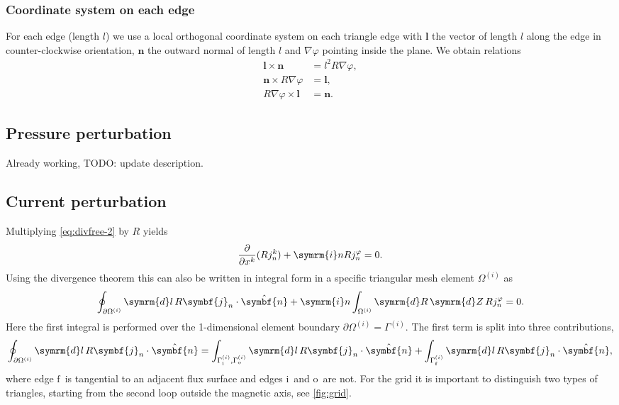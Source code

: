 \documentclass[a4paper, 10pt, english]{article}
\let\temp\vartheta
\let\vartheta\theta
\let\theta\temp
\let\temp\varphi
\let\varphi\phi
\let\phi\temp
\let\vec\symbf
\newcommand*\diff{\ensuremath{\symrm{d}}}  %
\newcommand*\im{\ensuremath{\symrm{i}}}  %
\newcommand*\pd[2][]{\ensuremath{\frac{\partial #1}{\partial #2}}}  %
\newcommand*\fs{\ensuremath{\textrm{f}}}  %
\newcommand*\inw{\ensuremath{\textrm{i}}}  %
\newcommand*\out{\ensuremath{\textrm{o}}}  %
\begin{document}
\subsubsection{Coordinate system on each edge}

For each edge (length $l$) we use a local orthogonal coordinate system on each triangle edge with $\vec{l}$ the vector of length $l$ along the edge in counter-clockwise orientation, $\vec{n}$ the outward normal of length $l$ and $\nabla \phi$ pointing inside the plane. We obtain relations
\begin{align}
  \vec{l} \times \vec{n} &= l^{2} R \nabla \phi, \\
  \vec{n} \times R \nabla \phi &= \vec{l}, \\
  R \nabla \phi \times \vec{l} &= \vec{n}.
\end{align}

\subsection{Pressure perturbation}

Already working, TODO: update description.

\subsection{Current perturbation}

Multiplying \cref{eq:divfree-2} by $R$ yields
\begin{gather}
  \pd{x^{k}} (R j_{n}^{k}) + \im n R j_{n}^{\phi} = 0.
\end{gather}
Using the divergence theorem this can also be written in integral form in a specific triangular mesh element $\Omega^{(i)}$ as
\begin{gather}
  \oint_{\partial \Omega^{(i)}} \diff l \, R \vec{j}_{n} \cdot \hat{\vec{n}} + \im n \int_{\Omega^{(i)}} \diff R \, \diff Z \, R j_{n}^{\phi} = 0.
\end{gather}
Here the first integral is performed over the 1-dimensional element boundary $\partial \Omega^{(i)} = \Gamma^{(i)}$. The first term is split into three contributions,
\begin{gather}
  \oint_{\partial \Omega^{(i)}} \diff l \, R \vec{j}_{n} \cdot \hat{\vec{n}} = \int_{\Gamma_{\inw}^{(i)}, \Gamma_{\out}^{(i)}} \diff l \, R \vec{j}_{n} \cdot \hat{\vec{n}} + \int_{\Gamma_{\fs}^{(i)}} \diff l \, R \vec{j}_{n} \cdot \hat{\vec{n}}, \label{eq:integral law}
\end{gather}
where edge \fs\ is tangential to an adjacent flux surface and edges \inw\ and \out\ are not. For the grid it is important to distinguish two types of triangles, starting from the second loop outside the magnetic axis, see \cref{fig:grid}.
\end{document}
